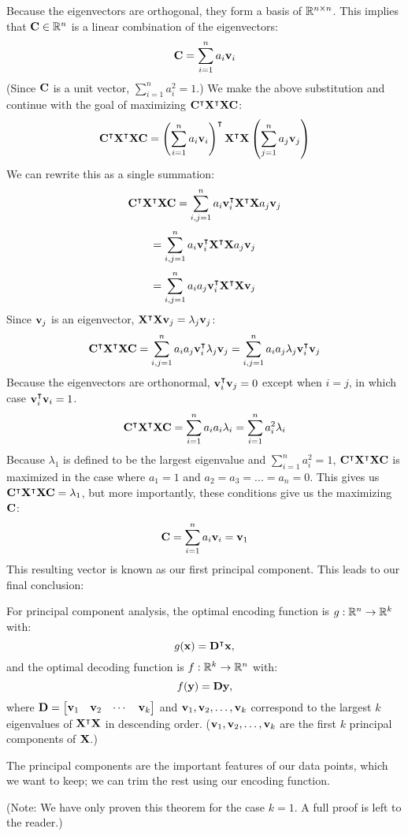 Because the eigenvectors are orthogonal, they form a basis of $\R^{n \times n}$.  This implies that $\MC \in \R^n$ is a linear combination of the eigenvectors:
$$\MC = \sum^n_{i=1} a_i\vv_i$$
(Since $\MC$ is a unit vector, $\sum^n_{i=1} a^2_i = 1$.)  We make the above substitution and continue with the goal of maximizing $\MC^\intercal\MX^\intercal\MX\MC$:
$$\MC^\intercal\MX^\intercal\MX\MC = \left(\sum^n_{i=1} a_i\vv_i\right)^\intercal\MX^\intercal\MX\left(\sum^n_{j=1} a_j\vv_j\right)$$
We can rewrite this as a single summation:
$$\MC^\intercal\MX^\intercal\MX\MC = \sum^n_{i,j=1} a_i\vv^\intercal_i\MX^\intercal\MX a_j\vv_j$$
$$= \sum^n_{i,j=1} a_i\vv^\intercal_i\MX^\intercal\MX a_j\vv_j$$
$$= \sum^n_{i,j=1} a_ia_j\vv^\intercal_i\MX^\intercal\MX \vv_j$$
Since $\vv_j$ is an eigenvector, $\MX^\intercal\MX \vv_j = \lambda_j\vv_j$:
$$\MC^\intercal\MX^\intercal\MX\MC = \sum^n_{i,j=1} a_ia_j\vv^\intercal_i\lambda_j\vv_j = \sum^n_{i,j=1} a_ia_j\lambda_j\vv^\intercal_i\vv_j$$
Because the eigenvectors are orthonormal, $\vv^\intercal_i\vv_j = 0$ except when $i = j$, in which case $\vv_i^\intercal\vv_i = 1$.
$$\MC^\intercal\MX^\intercal\MX\MC = \sum^n_{i=1} a_ia_i\lambda_i = \sum^n_{i=1} a^2_i\lambda_i$$
Because $\lambda_1$ is defined to be the largest eigenvalue and $\sum^n_{i=1} a^2_i = 1$, $\MC^\intercal\MX^\intercal\MX\MC$ is maximized in the case where $a_1 = 1$ and $a_2 = a_3 = ... = a_n = 0$.  This gives us $\MC^\intercal\MX^\intercal\MX\MC = \lambda_1$, but more importantly, these conditions give us the maximizing $\MC$:
$$\MC = \sum^n_{i=1} a_i\vv_i = \vv_1$$
This resulting vector is known as our first principal component.  This leads to our final conclusion:
\begin{theorem}
    For principal component analysis, the optimal encoding function is $g : \R^n \to \R^k$ with:
    $$g(\vx) = \MD^\intercal\vx,$$
    and the optimal decoding function is $f : \R^k \to \R^n$ with:
    $$f(\vy) = \MD\vy,$$
    where $\MD = \begin{bmatrix} \vv_1 & \vv_2 & \cdots & \vv_k \end{bmatrix}$ and $\vv_1, \vv_2, \ldots, \vv_k$ correspond to the largest $k$ eigenvalues of $\MX^\intercal\MX$ in descending order.  ($\vv_1, \vv_2, \ldots, \vv_k$ are the first $k$ principal components of $\MX$.)
\end{theorem}
The principal components are the important features of our data points, which we want to keep; we can trim the rest using our encoding function.

(Note: We have only proven this theorem for the case $k = 1$.  A full proof is left to the reader.)

